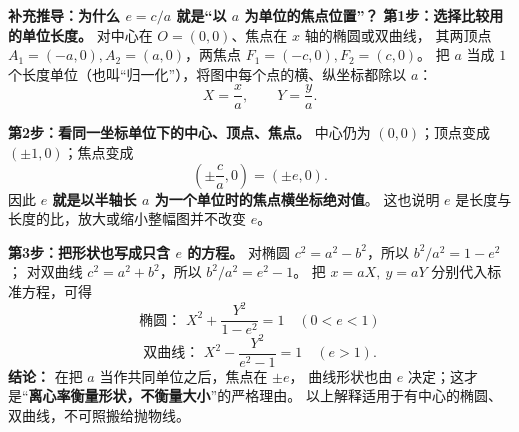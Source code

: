 \begin{proofbox}
\textbf{补充推导：为什么 $e=c/a$ 就是“以 $a$ 为单位的焦点位置”？}
\textbf{第1步：选择比较用的单位长度。}
对中心在 $O=(0,0)$、焦点在 $x$ 轴的椭圆或双曲线，
其两顶点 $A_1=(-a,0),A_2=(a,0)$，两焦点 $F_1=(-c,0),F_2=(c,0)$。
把 $a$ 当成 $1$ 个长度单位（也叫“归一化”），将图中每个点的横、纵坐标都除以 $a$：
\[
 X=\frac xa,\qquad Y=\frac ya.
\]

\textbf{第2步：看同一坐标单位下的中心、顶点、焦点。}
中心仍为 $(0,0)$；顶点变成 $(\pm1,0)$；焦点变成
\[
 \left(\pm\frac ca,0\right)=\boxed{(\pm e,0)}.
\]
因此 \textbf{$e$ 就是以半轴长 $a$ 为一个单位时的焦点横坐标绝对值}。
这也说明 $e$ 是长度与长度的比，放大或缩小整幅图并不改变 $e$。

\medskip
\textbf{第3步：把形状也写成只含 $e$ 的方程。}
对椭圆 $c^2=a^2-b^2$，所以 $b^2/a^2=1-e^2$；
对双曲线 $c^2=a^2+b^2$，所以 $b^2/a^2=e^2-1$。
把 $x=aX,\ y=aY$ 分别代入标准方程，可得
\[
\boxed{\text{椭圆： }X^2+\frac{Y^2}{1-e^2}=1\quad(0<e<1)}
\]
\[
\boxed{\text{双曲线： }X^2-\frac{Y^2}{e^2-1}=1\quad(e>1)}.
\]
\textbf{结论：} 在把 $a$ 当作共同单位之后，焦点在 $\pm e$，
曲线形状也由 $e$ 决定；这才是“\textbf{离心率衡量形状，不衡量大小}”的严格理由。
以上解释适用于有中心的椭圆、双曲线，不可照搬给抛物线。
\end{proofbox}
\clearpage



